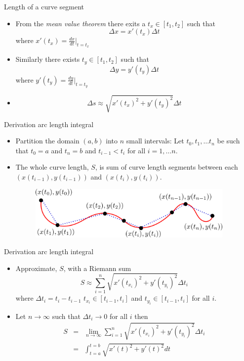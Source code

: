 \documentclass{beamer}
\begin{document}
\begin{frame}{Length of a curve segment}	
	\begin{itemize}
		\item From the \emph{mean value theorem} there exits a $t_x \in [t_1, t_2]$ such that	
		\[
			\Delta x = x'(t_x) \Delta t
		\]
		where $x'(t_x) = \frac{dx}{dt}\big|_{t=t_x}$
		\item Similarly there exists $t_y \in [t_1, t_2]$ such that 
		\[
			\Delta y = y'(t_y) \Delta t
		\]
		where $y'(t_y) = \frac{dy}{dt}\big|_{t=t_y}$ 
		\item 
		\[
			\Delta s \approx \sqrt{x'(t_x)^2 + y'(t_y)^2} \Delta t
		\]
	\end{itemize}
\end{frame}

\begin{frame}{Derivation arc length integral}
	
	\begin{itemize}
		\item Partition the domain $(a,b)$ into $n$ small intervals: Let $t_0, t_1, \dots t_n$ be such that $t_0=a$ and $t_n=b$ and $t_{i-1} < t_{i}$ for all $i=1, \dots n$. 
		\item The whole curve length, $S$, is sum of curve length segments between each $(x(t_{i-1}), y(t_{i-1}))$ and $(x(t_i), y(t_i))$.  
		\begin{figure}
			\centering
			\includegraphics[width=100mm, scale=0.4]{curve_length_total.png}
		\end{figure}
	\end{itemize}
\end{frame}

\begin{frame}{Derivation arc length integral}
	
	\begin{itemize}
		\item Approximate, $S$, with a Riemann sum 
		\[
		S \approx \sum\limits^{n}_{i=1} \sqrt{x'(t_{x_i})^2 + y'(t_{y_i})^2} \Delta t_i 
		\] 
		where $\Delta t_i = t_i-t_{i-1}$
		$t_{x_i} \in [t_{i-1}, t_{i}]$ and $t_{y_i} \in [t_{i-1}, t_{i}]$ for all $i$.
		\item Let $n \to \infty$ such that $\Delta t_i \to 0$ for all $i$ then
		\begin{eqnarray*}
			S &=& \lim_{n \to \infty} \sum\limits^{n}_{i=1} \sqrt{x'(t_{x_i})^2 + y'(t_{y_i})^2} \Delta t_i \\
			& = & \int_{t=a}^{t=b} \sqrt{x'(t)^2 + y'(t)^2 } dt
		\end{eqnarray*}
	\end{itemize}
\end{frame}
\end{document}
